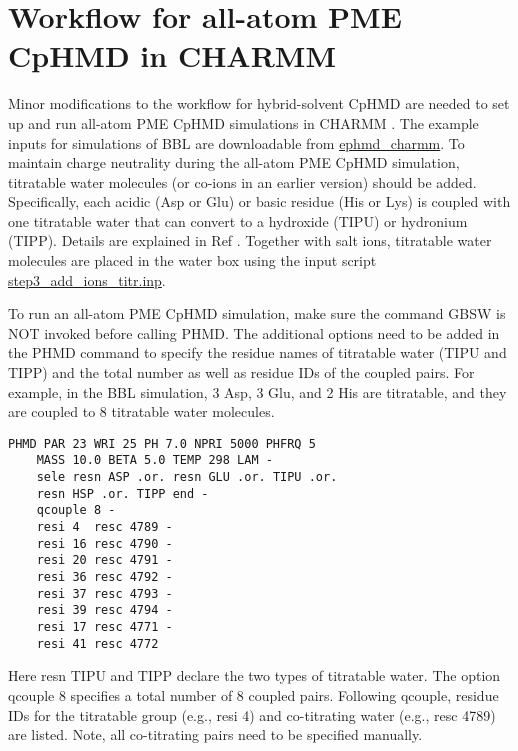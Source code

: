 \section{Workflow for all-atom PME CpHMD in CHARMM} 
Minor modifications to the workflow for 
hybrid-solvent CpHMD are needed 
to set up and run all-atom PME CpHMD 
simulations in CHARMM \cite{Huang_Shen_2016_J.Chem.TheoryComput.}. 
The example inputs for simulations of BBL are downloadable from  \href{https://gitlab.com/shenlab-amber-cphmd/cphmd-tutorial/-/tree/main/ephmd_charmm/}{ephmd\_charmm}.
To maintain charge neutrality during the
all-atom PME CpHMD simulation, 
titratable water molecules  
\cite{Chen_Shen_2013_Biophys.J.}
(or co-ions \cite{Wallace_Shen_2012_J.Chem.Phys.} in an earlier version) should be added.
Specifically, each acidic (Asp or Glu) or 
basic residue (His or Lys) is 
coupled with one titratable water that can convert to a hydroxide (TIPU) or hydronium (TIPP). Details are explained in Ref \cite{Chen_Shen_2013_Biophys.J.}.
Together with salt ions, titratable water molecules are placed in the water box using the input script
\href{https://gitlab.com/shenlab-amber-cphmd/cphmd-tutorial/-/tree/main/ephmd_charmm/bbl_sys_prep/}
{step3\_add\_ions\_titr.inp}.

To run an all-atom PME CpHMD simulation, make sure
the command GBSW is NOT invoked before calling PHMD.
The additional options need to be added in the PHMD command to specify the residue names of titratable water (TIPU and TIPP) and the total number as well as residue IDs of the coupled pairs.
For example, in the BBL simulation, 3 Asp, 3 Glu, and 2 His
are titratable, and they are coupled to 8 titratable water molecules. 
%
\begin{lstlisting}
PHMD PAR 23 WRI 25 PH 7.0 NPRI 5000 PHFRQ 5 
    MASS 10.0 BETA 5.0 TEMP 298 LAM -
    sele resn ASP .or. resn GLU .or. TIPU .or. 
    resn HSP .or. TIPP end - 
    qcouple 8 - 
    resi 4  resc 4789 -
    resi 16 resc 4790 -
    resi 20 resc 4791 -
    resi 36 resc 4792 -
    resi 37 resc 4793 -
    resi 39 resc 4794 -
    resi 17 resc 4771 -
    resi 41 resc 4772 
\end{lstlisting}
%
Here resn TIPU and TIPP declare the two types of titratable water. 
The option qcouple 8 specifies
a total number of 8 coupled pairs. 
Following qcouple, residue IDs for the titratable group 
(e.g., resi 4) and co-titrating water (e.g., resc 4789) are listed. 
Note, all co-titrating pairs need to be specified manually.

